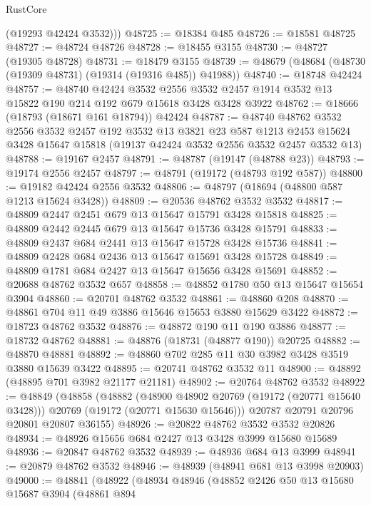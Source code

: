 \begin{lexlean}{RustCore}
\begin{coremodule}
        (@19293 @42424 @3532)))
@48725 := @18384 @485
@48726 := @18581 @48725
@48727 := @48724 @48726
@48728 := @18455 @3155
@48730 := @48727 (@19305 @48728)
@48731 := @18479 @3155
@48739 := @48679 (@48684 (@48730 (@19309 @48731) (@19314 (@19316 @485)) @41988))
@48740 := @18748 @42424
@48757 := @48740
    @42424
    @3532
    @2556
    @3532
    @2457
    @1914
    @3532
    @13
    @15822
    @190
    @214
    @192
    @679
    @15618
    @3428
    @3428
    @3922
@48762 := @18666 (@18793 (@18671 @161 @18794)) @42424
@48787 := @48740
    @48762
    @3532
    @2556
    @3532
    @2457
    @192
    @3532
    @13
    @3821
    @23
    @587
    @1213
    @2453
    @15624
    @3428
    @15647
    @15818
    (@19137 @42424 @3532 @2556 @3532 @2457 @3532 @13)
@48788 := @19167 @2457
@48791 := @48787 (@19147 (@48788 @23))
@48793 := @19174 @2556 @2457
@48797 := @48791 (@19172 (@48793 @192 @587))
@48800 := @19182 @42424 @2556 @3532
@48806 := @48797 (@18694 (@48800 @587 @1213 @15624 @3428))
@48809 := @20536 @48762 @3532 @3532
@48817 := @48809 @2447 @2451 @679 @13 @15647 @15791 @3428 @15818
@48825 := @48809 @2442 @2445 @679 @13 @15647 @15736 @3428 @15791
@48833 := @48809 @2437 @684 @2441 @13 @15647 @15728 @3428 @15736
@48841 := @48809 @2428 @684 @2436 @13 @15647 @15691 @3428 @15728
@48849 := @48809 @1781 @684 @2427 @13 @15647 @15656 @3428 @15691
@48852 := @20688 @48762 @3532 @657
@48858 := @48852 @1780 @50 @13 @15647 @15654 @3904
@48860 := @20701 @48762 @3532
@48861 := @48860 @208
@48870 := @48861 @704 @11 @49 @3886 @15646 @15653 @3880 @15629 @3422
@48872 := @18723 @48762 @3532
@48876 := @48872 @190 @11 @190 @3886
@48877 := @18732 @48762
@48881 := @48876 (@18731 (@48877 @190)) @20725
@48882 := @48870 @48881
@48892 := @48860 @702 @285 @11 @30 @3982 @3428 @3519 @3880 @15639 @3422
@48895 := @20741 @48762 @3532 @11
@48900 := @48892 (@48895 @701 @3982 @21177 @21181)
@48902 := @20764 @48762 @3532
@48922 := @48849
    (@48858
      (@48882
        (@48900 @48902 @20769 (@19172 (@20771 @15640 @3428)))
        @20769
        (@19172 (@20771 @15630 @15646)))
      @20787
      @20791
      @20796
      @20801
      @20807
      @36155)
@48926 := @20822 @48762 @3532 @3532 @20826
@48934 := @48926 @15656 @684 @2427 @13 @3428 @3999 @15680 @15689
@48936 := @20847 @48762 @3532
@48939 := @48936 @684 @13 @3999
@48941 := @20879 @48762 @3532
@48946 := @48939 (@48941 @681 @13 @3998 @20903)
@49000 := @48841
    (@48922
      (@48934
        @48946
        (@48852
          @2426
          @50
          @13
          @15680
          @15687
          @3904
          (@48861
            @894

\end{coremodule}
\end{lexlean}
